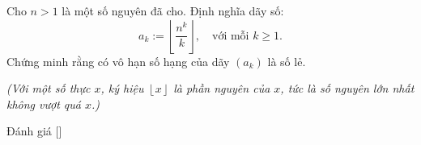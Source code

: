 \ifshowproblem
\begin{problem}\label{problem:GBR-2015-TST-F2-P2}
    Cho \( n > 1 \) là một số nguyên đã cho.  
    Định nghĩa dãy số:
    \[
        a_k := \left\lfloor \frac{n^k}{k} \right\rfloor, \quad \text{với mỗi } k \ge 1.
    \]
    Chứng minh rằng có vô hạn số hạng của dãy \( (a_k) \) là số lẻ.
    
    \textit{(Với một số thực \( x \), ký hiệu \( \left\lfloor x \right\rfloor \) là phần nguyên của \( x \),
    tức là số nguyên lớn nhất không vượt quá \( x \).)}
\end{problem}
\fi

\ifshowinfo
Đánh giá [\textbf{}]
\fi